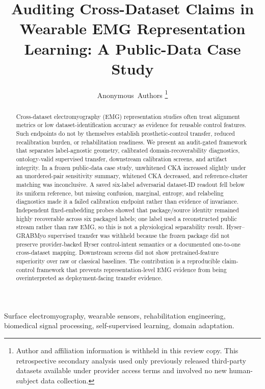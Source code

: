 \documentclass[journal]{IEEEtran}
\newcommand{\papertitle}{Auditing Cross-Dataset Claims in Wearable EMG Representation Learning: A Public-Data Case Study}
\begin{document}
\title{\papertitle}

\author{Anonymous~Authors%
\thanks{Author and affiliation information is withheld in this review copy. This retrospective secondary analysis used only previously released third-party datasets available under provider access terms and involved no new human-subject data collection.}}

\maketitle


\begin{abstract}
Cross-dataset electromyography (EMG) representation studies often treat alignment metrics or low dataset-identification accuracy as evidence for reusable control features. Such endpoints do not by themselves establish prosthetic-control transfer, reduced recalibration burden, or rehabilitation readiness. We present an audit-gated framework that separates label-agnostic geometry, calibrated domain-recoverability diagnostics, ontology-valid supervised transfer, downstream calibration screens, and artifact integrity. In a frozen public-data case study, unwhitened CKA increased slightly under an unordered-pair sensitivity summary, whitened CKA decreased, and reference-cluster matching was inconclusive. A saved six-label adversarial dataset-ID readout fell below its uniform reference, but missing confusion, marginal, entropy, and relabeling diagnostics made it a failed calibration endpoint rather than evidence of invariance. Independent fixed-embedding probes showed that package/source identity remained highly recoverable across six packaged labels; one label used a reconstructed public stream rather than raw EMG, so this is not a physiological separability result. Hyser--GRABMyo supervised transfer was withheld because the frozen package did not preserve provider-backed Hyser control-intent semantics or a documented one-to-one cross-dataset mapping. Downstream screens did not show pretrained-feature superiority over raw or classical baselines. The contribution is a reproducible claim-control framework that prevents representation-level EMG evidence from being overinterpreted as deployment-facing transfer evidence.
\end{abstract}

\begin{IEEEkeywords}
Surface electromyography, wearable sensors, rehabilitation engineering, biomedical signal processing, self-supervised learning, domain adaptation.
\end{IEEEkeywords}
\end{document}

